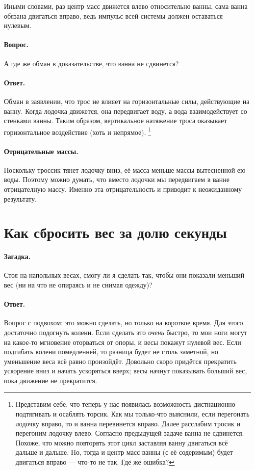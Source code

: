 Иными словами, раз центр масс движется влево относительно ванны, сама ванна обязана двигаться вправо, ведь импульс всей системы должен оставаться нулевым.

\paragraph{Вопрос.}
А где же обман в доказательстве, что ванна не сдвинется?

\paragraph{Ответ.}
Обман в заявлении, что трос не влияет на горизонтальные силы, действующие на ванну.
Когда лодочка движется, она передвигает воду, а вода взаимодействует со стенками ванны.
Таким образом, вертикальное натяжение троса оказывает горизонтальное воздействие (хоть и непрямое).%
\footnote{Представим себе, что теперь у нас появилась возможность дистнационно подтягивать и осаблять торсик. Как мы только-что выяснили, если перегонать лодочку вправо, то и ванна перевинется вправо. Далее расслабим тросик и перегоним лодочку влево.
Согласно предыдущей задаче ванна не сдвинется.
Похоже, что можно повторять этот цикл заставляя ванну двигаться всё дальше и дальше.
Но, тогда и центр масс ванны (с её содеримым) будет двигаться вправо --- что-то не так. Где же ошибка? \pr}

\paragraph{Отрицательные массы.}
Поскольку троссик тянет лодочку вниз, её масса меньше массы вытесненной ею воды.
Поэтому можно думать, что вместо лодочки мы передвигаем в ванне отрицателную массу.
Именно эта отрицательность и приводит к неожиданному результату.

\section{Как сбросить вес за долю секунды}

\paragraph{Загадка.}
Стоя на напольных весах, смогу ли я сделать так, чтобы они показали меньший вес (ни на что не опираясь и не снимая одежду)?

\paragraph{Ответ.} Вопрос с подвохом: это можно сделать, но только на короткое время.
Для этого достаточно подогнуть колени.
Если сделать это \emph{очень} быстро, то мои ноги могут на какое-то мгновение оторваться от опоры, и весы покажут нулевой вес.
Если подгибать колени помедленней, то разница будет не столь заметной, но уменьшение веса всё равно произойдёт.
Довольно скоро придётся прекратить ускорение вниз и начать ускоряться вверх;
весы начнут показывать больший вес, пока движение не прекратится.


